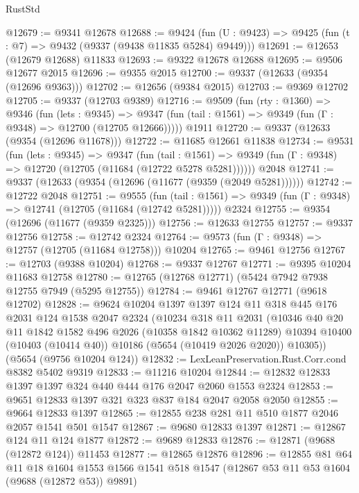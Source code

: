 \begin{lexlean}{RustStd}
\begin{coremodule}
@12679 := @9341 @12678
@12688 := @9424
    (fun (U : @9423) => @9425 (fun (t : @7) => @9432 (@9337 (@9438 @11835 @5284) @9449)))
@12691 := @12653 (@12679 @12688) @11833
@12693 := @9322 @12678 @12688
@12695 := @9506 @12677 @2015
@12696 := @9355 @2015
@12700 := @9337 (@12633 (@9354 (@12696 @9363)))
@12702 := @12656 (@9384 @2015)
@12703 := @9369 @12702
@12705 := @9337 (@12703 @9389)
@12716 := @9509
    (fun (rty : @1360) =>
    @9346
      (fun (lets : @9345) =>
      @9347 (fun (tail : @1561) => @9349 (fun (Γ : @9348) => @12700 (@12705 @12666)))))
    @1911
@12720 := @9337 (@12633 (@9354 (@12696 @11678)))
@12722 := @11685 @12661 @11838
@12734 := @9531
    (fun (lets : @9345) =>
    @9347
      (fun (tail : @1561) =>
      @9349 (fun (Γ : @9348) => @12720 (@12705 (@11684 (@12722 @5278 @5281))))))
    @2048
@12741 := @9337 (@12633 (@9354 (@12696 (@11677 (@9359 (@2049 @5281))))))
@12742 := @12722 @2048
@12751 := @9555
    (fun (tail : @1561) => @9349 (fun (Γ : @9348) => @12741 (@12705 (@11684 (@12742 @5281)))))
    @2324
@12755 := @9354 (@12696 (@11677 (@9359 @2325)))
@12756 := @12633 @12755
@12757 := @9337 @12756
@12758 := @12742 @2324
@12764 := @9573 (fun (Γ : @9348) => @12757 (@12705 (@11684 @12758))) @10204
@12765 := @9461 @12756
@12767 := @12703 (@9388 @10204)
@12768 := @9337 @12767
@12771 := @9395 @10204 @11683 @12758
@12780 := @12765 (@12768 @12771) (@5424 @7942 @7938 @12755 @7949 (@5295 @12755))
@12784 := @9461 @12767 @12771 (@9618 @12702)
@12828 := @9624
    @10204
    @1397
    @1397
    @124
    @11
    @318
    @445
    @176
    @2031
    @124
    @1538
    @2047
    @2324
    (@10234
      @318
      @11
      @2031
      (@10346
        @40
        @20
        @11
        @1842
        @1582
        @496
        @2026
        (@10358 @1842 @10362 @11289)
        @10394
        @10400
        (@10403 (@10414 @40))
        @10186
        (@5654 (@10419 @2026 @2020))
        @10305))
    (@5654 (@9756 @10204 @124))
@12832 := LexLeanPreservation.Rust.Corr.cond @8382 @5402 @9319
@12833 := @11216 @10204
@12844 := @12832 @12833 @1397 @1397 @324 @440 @444 @176 @2047 @2060 @1553 @2324
@12853 := @9651 @12833 @1397 @321 @323 @837 @184 @2047 @2058 @2050
@12855 := @9664 @12833 @1397
@12865 := @12855 @238 @281 @11 @510 @1877 @2046 @2057 @1541 @501 @1547
@12867 := @9680 @12833 @1397
@12871 := @12867 @124 @11 @124 @1877
@12872 := @9689 @12833
@12876 := @12871 (@9688 (@12872 @124)) @11453
@12877 := @12865 @12876
@12896 := @12855
    @81
    @64
    @11
    @18
    @1604
    @1553
    @1566
    @1541
    @518
    @1547
    (@12867 @53 @11 @53 @1604 (@9688 (@12872 @53)) @9891)

\end{coremodule}
\end{lexlean}
